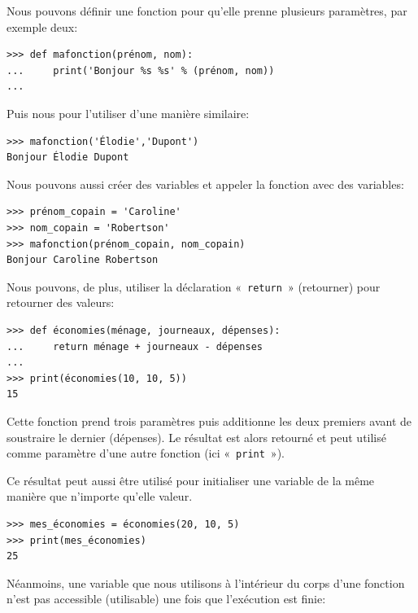 Nous pouvons définir une fonction pour qu'elle prenne plusieurs paramètres, par exemple deux:

\begin{Verbatim}[frame=single,rulecolor=\color{mbleu}, label=à taper]
>>> def mafonction(prénom, nom):
...     print('Bonjour %s %s' % (prénom, nom))
...
\end{Verbatim}

Puis nous pour l'utiliser d'une manière similaire:

\begin{Verbatim}[frame=single,rulecolor=\color{mbleu}, label=à taper]
>>> mafonction('Élodie','Dupont')
Bonjour Élodie Dupont
\end{Verbatim}

Nous pouvons aussi créer des variables et appeler la fonction avec des variables:

\begin{Verbatim}[frame=single,rulecolor=\color{mbleu}, label=à taper]
>>> prénom_copain = 'Caroline'
>>> nom_copain = 'Robertson'
>>> mafonction(prénom_copain, nom_copain)
Bonjour Caroline Robertson
\end{Verbatim}

Nous pouvons, de plus, utiliser la déclaration «~\texttt{return}~» (retourner) pour retourner des valeurs:

\begin{Verbatim}[frame=single,rulecolor=\color{mbleu}, label=à taper]
>>> def économies(ménage, journeaux, dépenses):
...     return ménage + journeaux - dépenses
...
>>> print(économies(10, 10, 5))
15
\end{Verbatim}

Cette fonction prend trois paramètres puis additionne les deux premiers avant de soustraire le dernier (dépenses). Le résultat est alors retourné et peut utilisé comme paramètre d'une autre fonction (ici «~\texttt{print}~»).

Ce résultat peut aussi être utilisé pour initialiser une variable de la même manière que n'importe qu'elle valeur.

\begin{Verbatim}[frame=single,rulecolor=\color{mbleu}, label=à taper]
>>> mes_économies = économies(20, 10, 5)
>>> print(mes_économies)
25
\end{Verbatim}

Néanmoins, une variable que nous utilisons à l'intérieur du corps d'une fonction n'est pas accessible (utilisable) une fois que l'exécution est finie:

